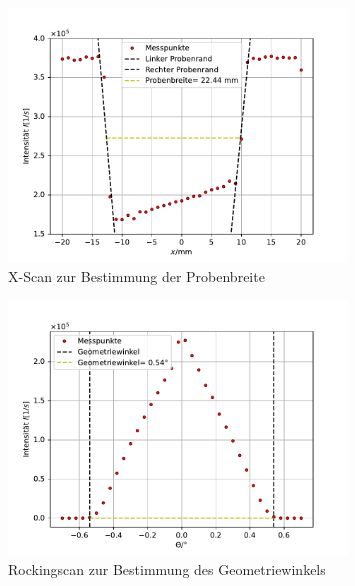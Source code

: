 \begin{figure}[H]
    \centering
    \includegraphics[width=0.8\textwidth]{plots/Xscan.pdf}
    \caption{X-Scan zur Bestimmung der Probenbreite}
    \label{fig:Xscan}
\end{figure}

\begin{figure}[H]
    \centering
    \includegraphics[width=0.8\textwidth]{plots/Rocking.pdf}
    \caption{Rockingscan zur Bestimmung des Geometriewinkels}
    \label{fig:Rocking}
\end{figure}
